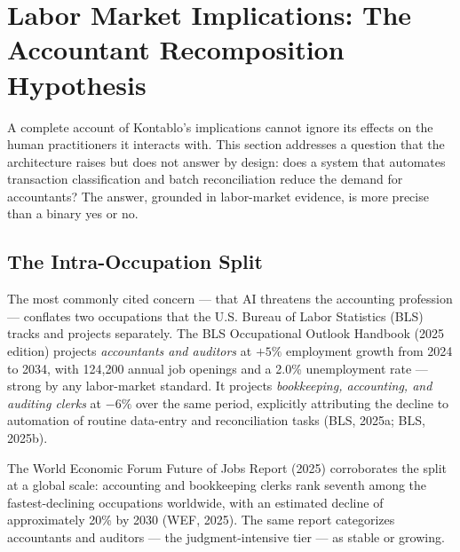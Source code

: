 
\section{Labor Market Implications: The Accountant Recomposition Hypothesis}
\label{sec:labor_market}

A complete account of Kontablo's implications cannot ignore its effects on
the human practitioners it interacts with. This section addresses a question
that the architecture raises but does not answer by design: does a system
that automates transaction classification and batch reconciliation reduce the
demand for accountants? The answer, grounded in labor-market evidence, is
more precise than a binary yes or no.

\subsection{The Intra-Occupation Split}
\label{subsec:occupation_split}

The most commonly cited concern --- that AI threatens the accounting
profession --- conflates two occupations that the U.S. Bureau of Labor
Statistics (BLS) tracks and projects separately. The BLS Occupational
Outlook Handbook (2025 edition) projects \emph{accountants and auditors}
at $+5\%$ employment growth from 2024 to 2034, with 124,200 annual job
openings and a 2.0\% unemployment rate --- strong by any labor-market
standard. It projects \emph{bookkeeping, accounting, and auditing clerks}
at $-6\%$ over the same period, explicitly attributing the decline to
automation of routine data-entry and reconciliation tasks (BLS, 2025a;
BLS, 2025b).

The World Economic Forum Future of Jobs Report (2025) corroborates the
split at a global scale: accounting and bookkeeping clerks rank seventh
among the fastest-declining occupations worldwide, with an estimated
decline of approximately 20\% by 2030 (WEF, 2025). The same report
categorizes accountants and auditors --- the judgment-intensive tier ---
as stable or growing.

